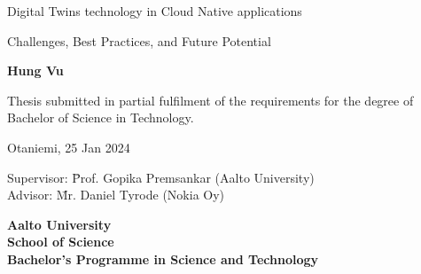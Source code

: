 {\parindent0pt %
\begin{spacing}{1.1}

 {\sffamily{}}
\end{spacing}

\vspace{12.7mm}

\begin{spacing}{1.63}
{\fontsize{17.8pt}{17.8pt}\selectfont Digital Twins technology in Cloud Native applications}
\end{spacing}

\vspace{10.5mm}

\begin{spacing}{1.2}
{\fontsize{13pt}{13pt}\selectfont Challenges, Best Practices, and Future Potential}
\end{spacing}

\vspace{10.6mm}

{\fontsize{13.9pt}{13.9pt}\bfseries\sffamily\lsstyle Hung Vu}

\vfill

{\fontsize{10.3pt}{10.3pt}\sffamily\lsstyle\raggedright
\begin{spacing}{1.06}

Thesis submitted in partial fulfilment of the requirements for the
degree of Bachelor of Science in Technology.

Otaniemi, 25 Jan 2024

\begin{tabbing}
Supervisor:\hspace{6mm} \= Prof. Gopika Premsankar (Aalto University) \\
Advisor: \hspace{6mm} \= Mr. Daniel Tyrode (Nokia Oy)
\end{tabbing}
\vspace{-4mm}
\end{spacing}
} %

\vspace{11.5mm}

\begin{spacing}{.9}
{\bfseries\sffamily\lsstyle Aalto University \\
School of Science \\
Bachelor’s Programme in Science and Technology}
\end{spacing}
} %



